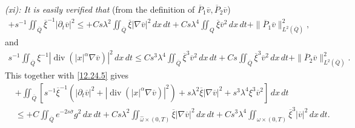 \documentclass[11pt]{article}
\numberwithin{equation}{section}
\DeclareMathOperator{\Div}{div}
\begin{document}
{\it (xi): It is easily verified that} (from the definition of $\overline{P}_1\overline{v}, \overline{P}_2\overline{v}$)
\begin{equation*}
	\begin{split}
		+s^{-1}\iint_{\overline{Q}}\overline{\xi}^{-1}|\partial_t\overline{v}|^2\leq +Cs\lambda^2\iint_{\overline{Q}}\overline{\xi} |\nabla \overline{v}|^2\,dx\,dt+Cs\lambda^4\iint_{Q} \overline{\xi} \overline{v}^2\,dx\,dt+\|\overline{P}_1\overline{v}\|_{L^2(\overline{Q})}^2,
	\end{split}
\end{equation*}
and
\begin{equation*}
	\begin{split}
		s^{-1}\iint_{\overline{Q}}\xi^{-1}|\Div(|x|^\alpha \nabla \overline{v})|^2\,dx\,dt\leq Cs^3\lambda^4\iint_{\overline{Q}}\overline{\xi}^3\overline{v}^2\,dx\,dt+Cs\iint_{\overline{Q}}\overline{\xi}^3 \overline{v}^2\,dx\,dt+\|\overline{P}_2\overline{v}\|_{L^2(\overline{Q})}^2.
	\end{split}
\end{equation*}
This together with \eqref{12.24.5} gives
\begin{equation}\label{12.24.6}
	\begin{split}
		&+\iint_{\overline{Q}} \left[s^{-1}\overline{\xi}^{-1}\left(|\partial_t \overline{v}|^2+|\Div(|x|^\alpha \nabla \overline{v})|^2\right)+s\lambda^2 \overline{\xi} |\nabla \overline{v}|^2+s^3\lambda^4 \xi^3 \overline{v}^2\right]\,dx\,dt\\
		&\leq +C\iint_{\overline{Q}}e^{-2s\overline{\sigma}}g^2\,dx\,dt+Cs\lambda^2\iint_{\widehat{\omega}\times (0,T)}\overline{\xi} |\nabla \overline{v}|^2\,dx\,dt+Cs^3\lambda^4\iint_{\widehat{\omega} \times (0,T)} \overline{\xi}^3|\overline{v}|^2\,dx\,dt.
	\end{split}
\end{equation}
\end{document}
